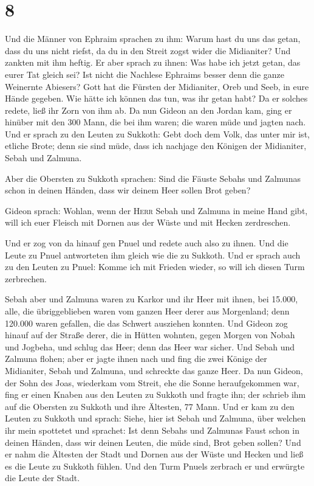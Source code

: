 \hypertarget{section-7}{%
\section{8}\label{section-7}}

 Und die Männer von Ephraim sprachen zu ihm: Warum hast du
uns das getan, dass du uns nicht riefst, da du in den Streit zogst wider
die Midianiter? Und zankten mit ihm heftig.  Er aber
sprach zu ihnen: Was habe ich jetzt getan, das eurer Tat gleich sei? Ist
nicht die Nachlese Ephraims besser denn die ganze Weinernte Abiesers?
 Gott hat die Fürsten der Midianiter, Oreb und Seeb, in
eure Hände gegeben. Wie hätte ich können das tun, was ihr getan habt? Da
er solches redete, ließ ihr Zorn von ihm ab.  Da nun
Gideon an den Jordan kam, ging er hinüber mit den 300 Mann, die bei ihm
waren; die waren müde und jagten nach.  Und er sprach zu
den Leuten zu Sukkoth: Gebt doch dem Volk, das unter mir ist, etliche
Brote; denn sie sind müde, dass ich nachjage den Königen der Midianiter,
Sebah und Zalmuna.

 Aber die Obersten zu Sukkoth sprachen: Sind die Fäuste
Sebahs und Zalmunas schon in deinen Händen, dass wir deinem Heer sollen
Brot geben?

 Gideon sprach: Wohlan, wenn der \textsc{Herr} Sebah und
Zalmuna in meine Hand gibt, will ich euer Fleisch mit Dornen aus der
Wüste und mit Hecken zerdreschen.

 Und er zog von da hinauf gen Pnuel und redete auch also
zu ihnen. Und die Leute zu Pnuel antworteten ihm gleich wie die zu
Sukkoth.  Und er sprach auch zu den Leuten zu Pnuel: Komme
ich mit Frieden wieder, so will ich diesen Turm zerbrechen.

 Sebah aber und Zalmuna waren zu Karkor und ihr Heer mit
ihnen, bei 15.000, alle, die übriggeblieben waren vom ganzen Heer derer
aus Morgenland; denn 120.000 waren gefallen, die das Schwert ausziehen
konnten.  Und Gideon zog hinauf auf der Straße derer, die
in Hütten wohnten, gegen Morgen von Nobah und Jogbeha, und schlug das
Heer; denn das Heer war sicher.  Und Sebah und Zalmuna
flohen; aber er jagte ihnen nach und fing die zwei Könige der
Midianiter, Sebah und Zalmuna, und schreckte das ganze Heer.
 Da nun Gideon, der Sohn des Joas, wiederkam vom Streit,
ehe die Sonne heraufgekommen war,  fing er einen Knaben
aus den Leuten zu Sukkoth und fragte ihn; der schrieb ihm auf die
Obersten zu Sukkoth und ihre Ältesten, 77 Mann.  Und er
kam zu den Leuten zu Sukkoth und sprach: Siehe, hier ist Sebah und
Zalmuna, über welchen ihr mein spottetet und sprachet: Ist denn Sebahs
und Zalmunas Faust schon in deinen Händen, dass wir deinen Leuten, die
müde sind, Brot geben sollen?  Und er nahm die Ältesten
der Stadt und Dornen aus der Wüste und Hecken und ließ es die Leute zu
Sukkoth fühlen.  Und den Turm Pnuels zerbrach er und
erwürgte die Leute der Stadt.

